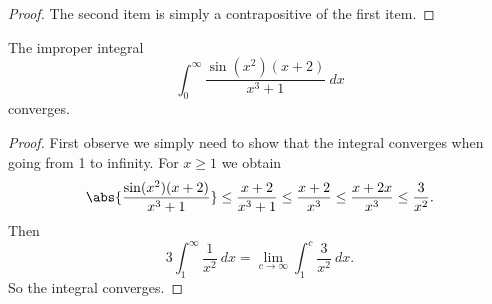 \documentclass[12pt]{book}
\begin{document}
\begin{proof}
The second item is simply a contrapositive of the first item.
\end{proof}

\begin{example}
The improper integral
\begin{equation*}
\int_0^\infty \frac{\sin(x^2)(x+2)}{x^3+1} ~dx
\end{equation*}
converges.

\begin{proof}  First observe we simply need to show
that the integral converges when going from 1 to infinity.
For $x \geq 1$ we obtain
\begin{equation*}
\abs{\frac{\sin(x^2)(x+2)}{x^3+1}}
\leq
\frac{x+2}{x^3+1}
\leq \frac{x+2}{x^3} \leq
\frac{x+2x}{x^3} \leq \frac{3}{x^2} .
\end{equation*}
Then
\begin{equation*}
3 \int_1^\infty \frac{1}{x^2}~dx
=
\lim_{c\to\infty} \int_1^c \frac{3}{x^2} ~dx.
\end{equation*}
So the integral converges.
\end{proof}
\end{example}
\end{document}
